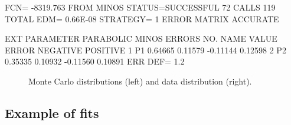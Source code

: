 \begin{changebar}
\begin{Listing}
{ FCN=  -8319.763     FROM MINOS     STATUS=SUCCESSFUL    72 CALLS      119 TOTAL
                     EDM=  0.66E-08    STRATEGY= 1      ERROR MATRIX ACCURATE
 
  EXT PARAMETER                  PARABOLIC         MINOS ERRORS
  NO.   NAME        VALUE          ERROR      NEGATIVE      POSITIVE
   1      P1       0.64665       0.11579      -0.11144       0.12598
   2      P2       0.35335       0.10932      -0.11560       0.10891
                               ERR DEF=   1.2
}
\end{Listing}
\begin{figure}[h]
\begin{center}
\mbox{}
\end{center}
\caption{Monte Carlo distributions (left) and
data distribution (right).}
\label{Efield}
\end{figure}
%
\end{changebar}
 
\newpage%

\subsection{Example of fits}


